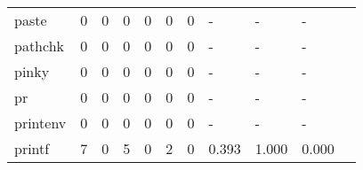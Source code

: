 \begin{longtable}{lp{1.20cm}p{1.20cm}p{1.20cm}p{1.20cm}p{1.20cm}p{1.20cm}p{1.20cm}p{1.20cm}p{1.20cm}p{1.20cm}}
paste     &                                     0 &                                                  0 &                                                  0 &                                                  0 &                                                  0 &                                                  0 &                                             - &                                                  - &                                                  - \\
pathchk   &                                     0 &                                                  0 &                                                  0 &                                                  0 &                                                  0 &                                                  0 &                                             - &                                                  - &                                                  - \\
pinky     &                                     0 &                                                  0 &                                                  0 &                                                  0 &                                                  0 &                                                  0 &                                             - &                                                  - &                                                  - \\
pr        &                                     0 &                                                  0 &                                                  0 &                                                  0 &                                                  0 &                                                  0 &                                             - &                                                  - &                                                  - \\
printenv  &                                     0 &                                                  0 &                                                  0 &                                                  0 &                                                  0 &                                                  0 &                                             - &                                                  - &                                                  - \\
printf    &                                     7 &                                                  0 &                                                  5 &                                                  0 &                                                  2 &                                                  0 &                                         0.393 &                                              1.000 &                                              0.000 \\

\end{longtable}
